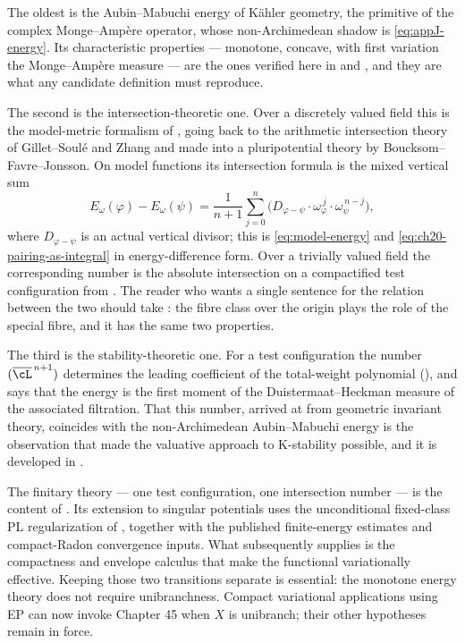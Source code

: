 The oldest is the Aubin--Mabuchi energy of Kähler geometry, the primitive
of the complex Monge--Amp\`ere operator, whose non-Archimedean shadow is
\eqref{eq:appJ-energy}.  Its characteristic properties --- monotone,
concave, with first variation the Monge--Amp\`ere measure --- are the ones
verified here in  and
, and they are what any candidate definition must
reproduce.

The second is the intersection-theoretic one.  Over a discretely valued
field this is the model-metric formalism of
, going back to the arithmetic
intersection theory of Gillet--Soulé and Zhang and made into a
pluripotential theory by Boucksom--Favre--Jonsson.  On model functions its
intersection formula is the mixed vertical sum
\[
 E_\omega(\varphi)-E_\omega(\psi)
 =\frac1{n+1}\sum_{j=0}^n
  \bigl(D_{\varphi-\psi}\cdot
        \omega_\varphi^{\,j}\cdot\omega_\psi^{\,n-j}\bigr),
\]
where $D_{\varphi-\psi}$ is an actual vertical divisor; this is
\eqref{eq:model-energy} and \eqref{eq:ch20-pairing-as-integral} in
energy-difference form.  Over a trivially valued field the corresponding
number is the absolute intersection on a compactified test configuration
from .  The reader who wants a single
sentence for the relation between the two should take
: the fibre class over the origin plays the role
of the special fibre, and it has the same two properties.

The third is the stability-theoretic one.  For a test configuration the
number $(\overline\cL^{\,n+1})$ determines the leading coefficient
of the total-weight polynomial (), and
 says that the energy is the first moment of the
Duistermaat--Heckman measure of the associated filtration.  That this
number, arrived at from geometric invariant theory, coincides with the
non-Archimedean Aubin--Mabuchi energy is the observation that made the
valuative approach to K-stability possible, and it is developed in
.

The finitary theory --- one test configuration, one intersection number ---
is the content of .  Its extension
to singular potentials uses the unconditional fixed-class PL
regularization of , together with the
published finite-energy estimates and compact-Radon convergence inputs.  What
 subsequently supplies is the
compactness and envelope calculus that make the functional variationally
effective.  Keeping those two transitions separate is essential: the
monotone energy theory does not require unibranchness.  Compact
variational applications using EP can now invoke Chapter 45 when $X$ is
unibranch; their other hypotheses remain in force.


